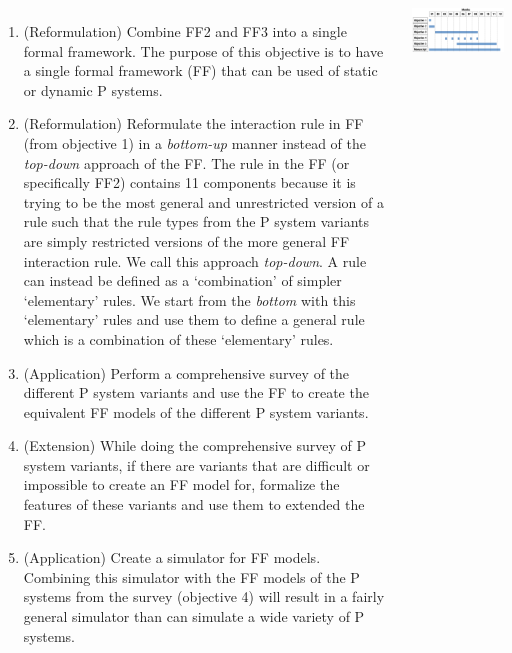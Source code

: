 \documentclass[25pt, a0paper, portrait]{tikzposter}
\begin{document}
\begin{columns}


{
\begin{enumerate}                                                                                    
   \item (Reformulation) Combine FF2 and FF3 into a single formal framework. The purpose of this objective is to have a single formal framework (FF)        
         that can be used of static or dynamic P systems.                                                 
   \item (Reformulation) Reformulate the interaction rule in FF (from objective 1) in a                   
         \emph{bottom-up} manner instead of the \emph{top-down} approach of the FF. The rule in the       
         FF (or specifically FF2) contains 11 components because it is trying to be the most general      
         and unrestricted version of a rule such that the rule types from the P system variants are  
         simply restricted versions of the more general FF interaction rule. We call this approach   
          \emph{top-down}. A rule    
         can instead be defined as a `combination' of simpler `elementary' rules. We start from the  
         \emph{bottom} with this `elementary' rules and use them to define a general rule which is   
         a combination of these `elementary' rules.                                                  
   \item (Application) Perform a comprehensive survey of the different P system variants and use the 
         FF to create the equivalent FF models of the different P system variants.                   
   \item (Extension) While doing the comprehensive survey of P system variants, if there are         
         variants that are difficult or impossible to create an FF model for, formalize the features 
         of these variants and use them to extended the FF.                           
   \item (Application) Create a simulator for FF models. Combining this simulator with the FF models 
        of the P systems from the survey (objective 4) will result in a fairly general simulator     
        than can simulate a wide variety of P systems.                                               
\end{enumerate}   

}


{
   \begin{tikzfigure}
   \includegraphics[scale=1.3]{figures/zzz-schedule.pdf}
   \end{tikzfigure}
}

\end{columns}
 
\end{document}
